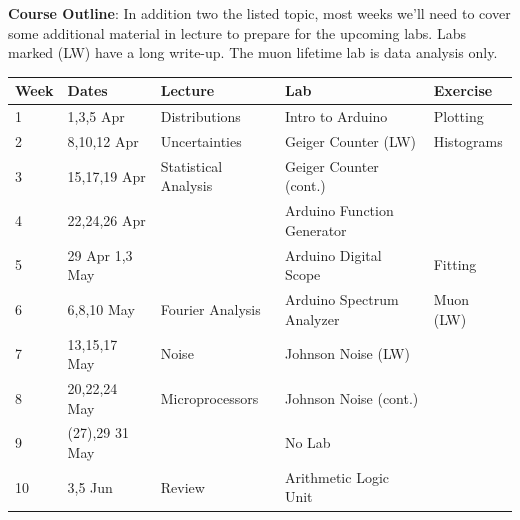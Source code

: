 \documentclass[12pt]{article}
\begin{document}
\begin{samepage}
\vskip 0.5cm
\noindent
\textbf {Course Outline}:
In addition two the listed topic, most weeks we'll need to cover some additional material in lecture to prepare for the upcoming labs.  Labs marked (LW) have a long write-up.  The muon lifetime lab is data analysis only.

\begin{table}[h!]
\begin{tabular}{ lllll }
\hline
\textbf{Week} & \textbf{Dates} & \textbf{Lecture} & \textbf{Lab}  & \textbf{Exercise}\\
\hline
1 & 1,3,5 Apr & Distributions & Intro to Arduino & Plotting \\
\hline
2 & 8,10,12 Apr &  Uncertainties& Geiger Counter (LW) & Histograms \\
\hline
3 & 15,17,19 Apr &  Statistical Analysis & Geiger Counter (cont.)  & \\
\hline
4 & 22,24,26 Apr &  & Arduino Function Generator & \\
\hline
5 & 29 Apr 1,3 May & & Arduino Digital Scope & Fitting \\
\hline
6 & 6,8,10 May & Fourier Analysis & Arduino Spectrum Analyzer & Muon (LW)\\
\hline
7 & 13,15,17 May & Noise & Johnson Noise (LW) \\
\hline
8 & 20,22,24 May & Microprocessors & Johnson Noise (cont.)\\
\hline
9 & (27),29 31 May &  &  No Lab \\
\hline
10 &  3,5 Jun &  Review & Arithmetic Logic Unit\\
\hline
\end{tabular} 
\end{table}
\end{samepage}
\end{document}
